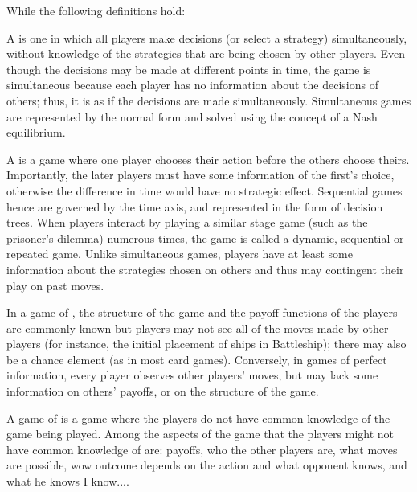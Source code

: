 While the following definitions hold:

\begin{definition}
	A  is one in which all players make decisions (or select a strategy) simultaneously, without knowledge of the strategies that are being chosen by other players. Even though the decisions may be made at different points in time, the game is simultaneous because each player has no information about the decisions of others; thus, it is as if the decisions are made simultaneously. Simultaneous games are represented by the normal form and solved using the concept of a Nash equilibrium.
\end{definition}

\begin{definition} 
A  is a game where one player chooses their action before the others choose theirs. Importantly, the later players must have some information of the first's choice, otherwise the difference in time would have no strategic effect. Sequential games hence are governed by the time axis, and represented in the form of decision trees. When players interact by playing a similar stage game (such as the prisoner's dilemma) numerous times, the game is called a dynamic, sequential or repeated game. Unlike simultaneous games, players have at least some information about the strategies chosen on others and thus may contingent their play on past moves.
\end{definition}

\begin{definition}
	In a game of , the structure of the game and the payoff functions of the players are commonly known but players may not see all of the moves made by other players (for instance, the initial placement of ships in Battleship); there may also be a chance element (as in most card games). Conversely, in games of perfect information, every player observes other players' moves, but may lack some information on others' payoffs, or on the structure of the game.
\end{definition}

\begin{definition} 
A game of  is a game where the players do not have common knowledge of the game being played. Among the aspects of the game that the players might not have common knowledge of are: payoffs, who the other players are, what moves are possible, wow outcome depends on the action and  what opponent knows, and what he knows I know....
\end{definition}

